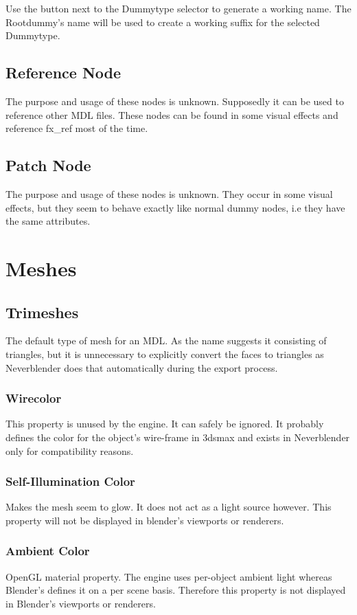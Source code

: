 Use the button next to the Dummytype selector to generate a
working name. The Rootdummy's name will be used to create a working
suffix for the selected Dummytype. \\

\subsection{Reference Node}
The purpose and usage of these nodes is unknown. Supposedly it can be used to
reference other MDL files. These nodes can be found in some visual effects and reference fx\_ref 
most of the time.

\subsection{Patch Node}
The purpose and usage of these nodes is unknown. They occur in some visual effects, but
they seem to behave exactly like normal dummy nodes, i.e they have the same
attributes.

\section{Meshes}

\subsection{Trimeshes}
The default type of mesh for an MDL. As the name suggests it consisting of 
triangles, but it is unnecessary to explicitly convert the faces to triangles 
as Neverblender does that automatically during the export process.

\subsubsection*{Wirecolor}
This property is unused by the engine. It can safely be ignored. It probably defines the
color for the object's wire-frame in 3dsmax and exists in Neverblender only for 
compatibility reasons.

\subsubsection*{Self-Illumination Color}
Makes the mesh seem to glow. It does not act as a light source however.
This property will not be displayed in blender's viewports or renderers.

\subsubsection*{Ambient Color}
OpenGL material property. The engine uses per-object ambient light whereas Blender's 
defines it on a per scene basis. Therefore this property is not displayed in 
Blender's viewports or renderers.

